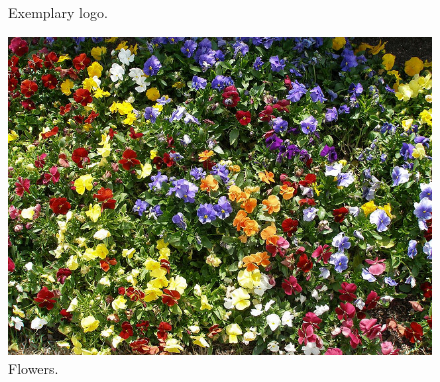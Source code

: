 \begin{refsection}
\begin{figure}[h!]
    \caption{Exemplary logo.}
    \label{fig:logo}
  \end{figure}

  \begin{figure}[h!]
    \centering
    \includegraphics[scale=0.05]{tikz_img/flowers.jpg}
    \caption{Flowers. \cite{turner06:_flower}}
    \label{fig:flowers}
  \end{figure}

  \FloatBarrier

  \printbibliography[heading=subbibliography]

\end{refsection}